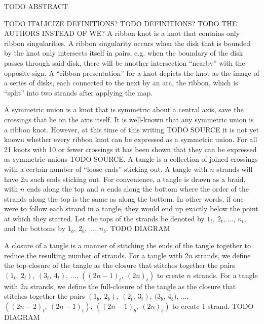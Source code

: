 

\begin{paperabstract}
TODO ABSTRACT
\end{paperabstract}
\begin{paper}
\theorems
TODO ITALICIZE DEFINITIONS?
TODO DEFINITIONS?
TODO THE AUTHORS INSTEAD OF WE?
A ribbon knot is a knot that contains only ribbon singularities.
A ribbon singularity occurs when the disk that is bounded by the knot only
intersects itself in pairs, e.g. when the boundary of the disk passes through
said disk, there will be another intersection ``nearby'' with the opposite sign.
A ``ribbon presentation'' for a knot depicts the knot as the image of a series
of disks, each connected to the next by an arc, the ribbon, which is ``split''
into two strands after applying the map.

A symmetric union is a knot that is symmetric about a central axis, save the
crossings that lie on the axis itself.
It is well-known that any symmetric union is a ribbon knot.
However, at this time of this writing TODO SOURCE it is not yet known whether
every ribbon knot can be expressed as a symmetric union.
For all 21 knots with 10 or fewer crossings it has been shown that they can be
expressed as symmetric unions TODO SOURCE.
A tangle is a collection of joined crossings with a certain number of ``loose
ends'' sticking out.
A tangle with $n$ strands will have $2n$ such ends sticking out.
For convenience, a tangle is drawn as a braid, with $n$ ends along the top and
$n$ ends along the bottom where the order of the strands along the top is the
same as along the bottom.
In other words, if one were to follow each strand in a tangle, they would end up
exactly below the point at which they started.
Let the tops of the strands be denoted by $1_t,~2_t$, ..., $n_t$, and the
bottoms  by $1_b,~2_b$, ..., $n_b$.
TODO DIAGRAM

A closure of a tangle is a manner of stitching the ends of the tangle together
to reduce the resulting number of strands.
For a tangle with $2n$ strands, we define the top-closure of the tangle as the
closure that stitches together the pairs $(1_t,~2_t),~(3_t,~4_t)$, ...,
$((2n-1)_t,~(2n)_t)$ to create $n$ strands.
For a tangle with $2n$ strands, we define the full-closure of the tangle as the
closure that stitches together the pairs $(1_b,~2_b),~(2_t,~3_t),~(3_b$,
$4_b)$, ..., $((2n-2)_t,~(2n-1)_t),~((2n-1)_b,~(2n)_b)$ to create 1
strand.
TODO DIAGRAM


\end{paper}
